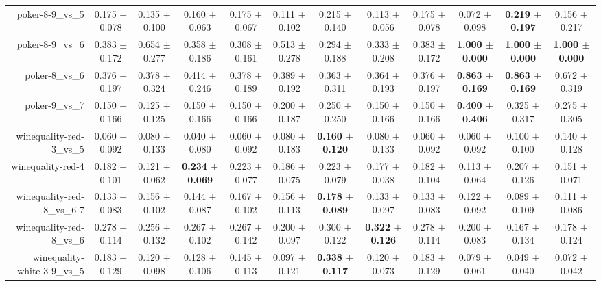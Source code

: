 \begin{table}[!ht]
{\begin{tabular}{r c c c c c c c c c c c}
poker-8-9\_vs\_5 & 0.175 $\pm$ 0.078 & 0.135 $\pm$ 0.100 & 0.160 $\pm$ 0.063 & 0.175 $\pm$ 0.067 & 0.111 $\pm$ 0.102 & 0.215 $\pm$ 0.140 & 0.113 $\pm$ 0.056 & 0.175 $\pm$ 0.078 & 0.072 $\pm$ 0.098 & \textbf{0.219 $\pm$ 0.197} & 0.156 $\pm$ 0.217 \\
poker-8-9\_vs\_6 & 0.383 $\pm$ 0.172 & 0.654 $\pm$ 0.277 & 0.358 $\pm$ 0.186 & 0.308 $\pm$ 0.161 & 0.513 $\pm$ 0.278 & 0.294 $\pm$ 0.188 & 0.333 $\pm$ 0.208 & 0.383 $\pm$ 0.172 & \textbf{1.000 $\pm$ 0.000} & \textbf{1.000 $\pm$ 0.000} & \textbf{1.000 $\pm$ 0.000} \\
poker-8\_vs\_6 & 0.376 $\pm$ 0.197 & 0.378 $\pm$ 0.324 & 0.414 $\pm$ 0.246 & 0.378 $\pm$ 0.189 & 0.389 $\pm$ 0.192 & 0.363 $\pm$ 0.311 & 0.364 $\pm$ 0.193 & 0.376 $\pm$ 0.197 & \textbf{0.863 $\pm$ 0.169} & \textbf{0.863 $\pm$ 0.169} & 0.672 $\pm$ 0.319 \\
poker-9\_vs\_7 & 0.150 $\pm$ 0.166 & 0.125 $\pm$ 0.125 & 0.150 $\pm$ 0.166 & 0.150 $\pm$ 0.166 & 0.200 $\pm$ 0.187 & 0.250 $\pm$ 0.250 & 0.150 $\pm$ 0.166 & 0.150 $\pm$ 0.166 & \textbf{0.400 $\pm$ 0.406} & 0.325 $\pm$ 0.317 & 0.275 $\pm$ 0.305 \\
winequality-red-3\_vs\_5 & 0.060 $\pm$ 0.092 & 0.080 $\pm$ 0.133 & 0.040 $\pm$ 0.080 & 0.060 $\pm$ 0.092 & 0.080 $\pm$ 0.183 & \textbf{0.160 $\pm$ 0.120} & 0.080 $\pm$ 0.133 & 0.060 $\pm$ 0.092 & 0.060 $\pm$ 0.092 & 0.100 $\pm$ 0.100 & 0.140 $\pm$ 0.128 \\
winequality-red-4 & 0.182 $\pm$ 0.101 & 0.121 $\pm$ 0.062 & \textbf{0.234 $\pm$ 0.069} & 0.223 $\pm$ 0.077 & 0.186 $\pm$ 0.075 & 0.223 $\pm$ 0.079 & 0.177 $\pm$ 0.038 & 0.182 $\pm$ 0.104 & 0.113 $\pm$ 0.064 & 0.207 $\pm$ 0.126 & 0.151 $\pm$ 0.071 \\
winequality-red-8\_vs\_6-7 & 0.133 $\pm$ 0.083 & 0.156 $\pm$ 0.102 & 0.144 $\pm$ 0.087 & 0.167 $\pm$ 0.102 & 0.156 $\pm$ 0.113 & \textbf{0.178 $\pm$ 0.089} & 0.133 $\pm$ 0.097 & 0.133 $\pm$ 0.083 & 0.122 $\pm$ 0.092 & 0.089 $\pm$ 0.109 & 0.111 $\pm$ 0.086 \\
winequality-red-8\_vs\_6 & 0.278 $\pm$ 0.114 & 0.256 $\pm$ 0.132 & 0.267 $\pm$ 0.102 & 0.267 $\pm$ 0.142 & 0.200 $\pm$ 0.097 & 0.300 $\pm$ 0.122 & \textbf{0.322 $\pm$ 0.126} & 0.278 $\pm$ 0.114 & 0.200 $\pm$ 0.083 & 0.167 $\pm$ 0.134 & 0.178 $\pm$ 0.124 \\
winequality-white-3-9\_vs\_5 & 0.183 $\pm$ 0.129 & 0.120 $\pm$ 0.098 & 0.128 $\pm$ 0.106 & 0.145 $\pm$ 0.113 & 0.097 $\pm$ 0.121 & \textbf{0.338 $\pm$ 0.117} & 0.120 $\pm$ 0.073 & 0.183 $\pm$ 0.129 & 0.079 $\pm$ 0.061 & 0.049 $\pm$ 0.040 & 0.072 $\pm$ 0.042 \\

\end{tabular}}
\end{table}
